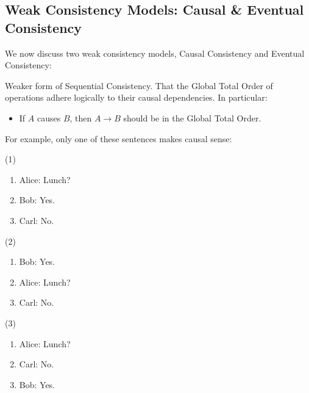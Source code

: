 \subsection{Weak Consistency Models: Causal \& Eventual Consistency}

We now discuss two weak consistency models, Causal Consistency and Eventual Consistency:

\begin{Def}
    
    Weaker form of Sequential Consistency. That the Global Total Order of operations adhere logically to their causal dependencies.
    In particular: 
    \begin{itemize}
        \item If $A$ causes $B$, then $A \rightarrow B$ should be in the Global Total Order.
    \end{itemize}
\end{Def}

\noindent
For example, only one of these sentences makes causal sense:

\begin{center}
\begin{minipage}{0.30\textwidth}

    \noindent
(1)
\begin{enumerate}
    \item Alice: Lunch?
    \item Bob: Yes.
    \item Carl: No.
\end{enumerate}
\end{minipage}
\begin{minipage}{0.30\textwidth}
(2)
\begin{enumerate}
    \item Bob: Yes.
    \item Alice: Lunch?
    \item Carl: No.
\end{enumerate}
\end{minipage}
\begin{minipage}{0.30\textwidth}
    (3)
    \begin{enumerate}
        \item Alice: Lunch?
        \item Carl: No.
        \item Bob: Yes.
    \end{enumerate}
    \end{minipage}
\end{center}

